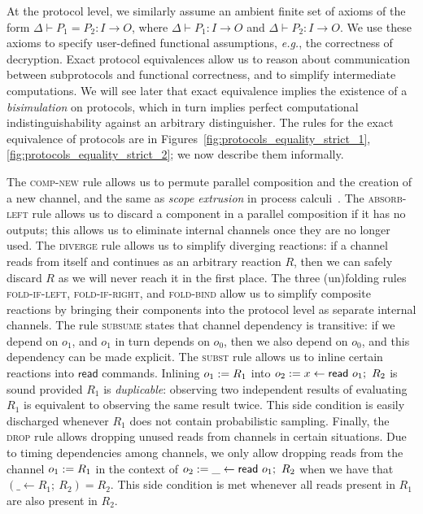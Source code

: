 At the protocol level, we similarly assume an ambient finite set of axioms of the form $\Delta \vdash P_1 = P_2 : I \to O$, where $\Delta \vdash P_1 : I \to O$ and $\Delta \vdash P_2 : I \to O$. We use these axioms to specify user-defined functional assumptions, \emph{e.g.}, the correctness of decryption. Exact protocol equivalences allow us to reason about communication between subprotocols and functional correctness, and to simplify intermediate computations. We will see later that exact equivalence implies the existence of a \emph{bisimulation} on protocols, which in turn implies perfect computational indistinguishability against an arbitrary distinguisher. The rules for the exact equivalence of protocols are in Figures~\ref{fig:protocols_equality_strict_1}, \ref{fig:protocols_equality_strict_2}; we now describe them informally.

The \textsc{comp-new} rule allows us to permute parallel composition and the creation of a new channel, and the same as \emph{scope
extrusion} in process calculi~\cite{picalc}. The \textsc{absorb-left} 
rule allows us to discard a component in a parallel composition if it has no outputs; this allows us to eliminate internal channels once they are no longer used. The \textsc{diverge} rule allows us to simplify diverging reactions: if a channel reads from itself and continues as an arbitrary reaction $R$, then we can safely discard $R$ as we will never reach it in the first place. The three (un)folding rules \textsc{fold-if-left}, \textsc{fold-if-right}, and \textsc{fold-bind} allow us to simplify composite reactions by bringing their
components into the protocol level as separate internal channels. The rule \textsc{subsume} states that channel dependency is transitive: if we depend on $o_1$, and $o_1$ in turn depends on $o_0$, then we also depend on $o_0$, and this dependency can be made explicit. The \textsc{subst} rule allows us to inline certain reactions into $\mathsf{read}$ commands. Inlining $o_1 := R_1$ into $\assign{o_2}{x \leftarrow \read{o_1}; \ R_2}$ is sound provided $R_1$ is \emph{duplicable}: observing two independent results of evaluating $R_1$ is equivalent to observing the same result twice. This side condition is easily discharged whenever $R_1$ does not contain probabilistic
sampling. Finally, the \textsc{drop} rule allows dropping unused reads from channels in certain situations. Due to timing dependencies among channels, we only allow dropping reads from the channel $o_1 := R_1$ in the context of $\assign{o_2}{\_ \leftarrow \read{o_1};\ R_2}$ when we have that $(\_ \leftarrow R_1; \ R_2) = R_2$. This side condition is met whenever all reads present in $R_1$ are also present in $R_2$.


